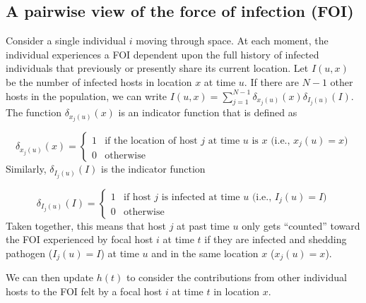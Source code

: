 \documentclass[11pt]{article}
\begin{document}
\subsection*{A pairwise view of the force of infection (FOI)}

Consider a single individual $i$ moving through space.   At each moment, the individual experiences a FOI dependent upon the full history of infected individuals that previously or presently share its current location.  Let $I(u, x)$ be the number of infected hosts in location $x$ at time $u$.  If there are $N - 1$ other hosts in the population, we can write $I(u, x) = \sum_{j = 1}^{N - 1} \delta_{x_j(u)}(x) \delta_{I_j(u)}(I)$. The function $\delta_{x_j(u)}(x)$ is an indicator function that is defined as 

\begin{equation*}
    \delta_{x_j(u)}(x) = 
    \begin{cases}
        1 &  \text{if the location of host $j$ at time $u$ is $x$ (i.e., $x_j(u) = x$)} \\
        0 & \text{otherwise}
    \end{cases}
\end{equation*}
Similarly, $\delta_{I_j(u)}(I)$ is the indicator function 

\begin{equation*}
    \delta_{I_j(u)}(I) = 
    \begin{cases}
        1 &  \text{if host $j$ is infected at time $u$ (i.e., $I_j(u) = I$)} \\
        0 & \text{otherwise}
    \end{cases}
\end{equation*}
Taken together, this means that host $j$ at past time $u$ only gets ``counted'' toward the FOI experienced by focal host $i$ at time $t$ if they are infected and shedding pathogen ($I_j(u) = I$) at time $u$ and in the same location $x$ ($x_j(u) = x$).

We can then update $h(t)$ to consider the contributions from other individual hosts to the FOI felt by a focal host $i$ at time $t$ in location $x$.
\end{document}
